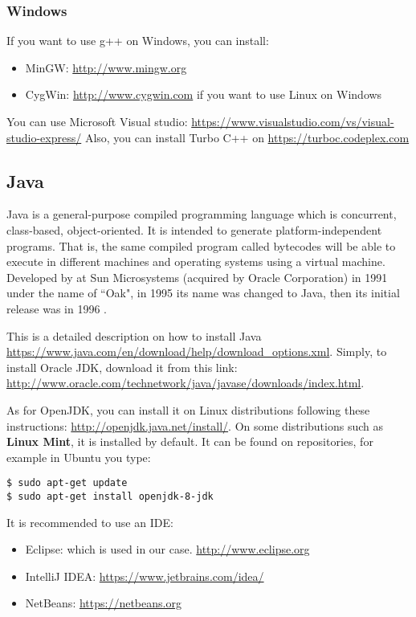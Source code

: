 \documentclass{KodeBookAr}
\begin{document}
\subsubsection{Windows}

If you want to use g++ on Windows, you can install:
\begin{itemize}
	\item MinGW: \url{http://www.mingw.org} 
	\item CygWin: \url{http://www.cygwin.com} if you want to use Linux on Windows
\end{itemize}

You can use Microsoft Visual studio: \url{https://www.visualstudio.com/vs/visual-studio-express/}
Also, you can install Turbo C++ on \url{https://turboc.codeplex.com}

\subsection{Java}


Java is a general-purpose compiled programming language which is concurrent, class-based, object-oriented. 
It is intended to generate platform-independent programs. 
That is, the same compiled program called bytecodes will be able to execute in different machines and operating systems using a virtual machine. 
Developed by  at Sun Microsystems (acquired by Oracle Corporation) in 1991 under the name of ``Oak", in 1995 its name was changed to Java, then its initial release was in 1996 \citep{2014-panigraphy}.

This is a detailed description on how to install Java \url{https://www.java.com/en/download/help/download_options.xml}.
Simply, to install Oracle JDK, download it from this link: \url{http://www.oracle.com/technetwork/java/javase/downloads/index.html}. 

As for OpenJDK, you can install it on Linux distributions following these instructions: \url{http://openjdk.java.net/install/}. 
On some distributions such as \textbf{Linux Mint}, it is installed by default.
It can be found on repositories, for example in Ubuntu you type:
\begin{lstlisting}[style=shellStyle]
$ sudo apt-get update
$ sudo apt-get install openjdk-8-jdk
\end{lstlisting}

It is recommended to use an IDE:
\begin{itemize}
	\item Eclipse: which is used in our case. \url{http://www.eclipse.org}
	\item IntelliJ IDEA: \url{https://www.jetbrains.com/idea/}
	\item NetBeans: \url{https://netbeans.org}
\end{itemize}
\end{document}
